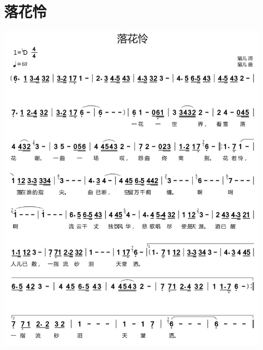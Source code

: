 \documentclass[cn,pad,twocol]{elegantbook}
\begin{document}
\section{落花怜} \includegraphics[width=\textwidth]{macos/20210208落花怜.png}
\end{document}
